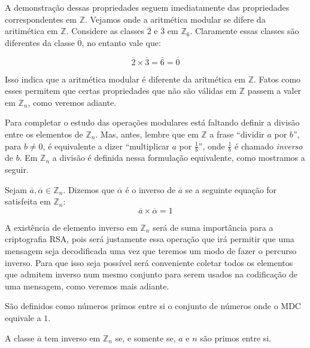 A demonstra\c{c}\~{a}o dessas propriedades seguem imediatamente das propriedades correspondentes em $\mathbb{Z}$.
Vejamos onde a aritm\'{e}tica modular se difere da aritim\'{e}tica em $\mathbb{Z}$. Considere as classes 
$\overline{2}$ e $\overline{3}$ em $\mathbb{Z}_{6}$. Claramente essas classes s\~{a}o diferentes
da classe $\overline{0}$, no entanto vale que:

$$\overline{2}\times\overline{3}=\overline{6}=\overline{0}$$
 
Isso indica que a aritm\'{e}tica modular \'{e} diferente da aritm\'{e}tica em $\mathbb{Z}$. Fatos como esses 
permitem que certas propriedades que n\~{a}o s\~{a}o v\'{a}lidas em $\mathbb{Z}$ passem a valer em $\mathbb{Z}_{n}$, como veremos 
adiante. 

Para completar o estudo das opera\c{c}\~{o}es modulares est\'{a} faltando definir a divis\~{a}o entre os elementos de $\mathbb{Z}_{n}$.
Mas, antes, lembre que em $\mathbb{Z}$ a frase ``dividir $a$ por $b$'', para $b\neq 0$, \'{e} equivalente a dizer
``multiplicar $a$ por $\frac{1}{b}$'', onde $\frac{1}{b}$ \'{e} chamado \textit{inverso} de $b$. 
Em $\mathbb{Z}_{n}$ a divis\~{a}o \'{e} definida nessa formula\c{c}\~{a}o equivalente, como mostramos a seguir. 

\begin{Df}
 Sejam $\overline{a},\overline{\alpha}\in\mathbb{Z}_{n}$. Dizemos que $\overline{\alpha}$ \'{e} o
inverso de $\overline{a}$ se a seguinte equa\c{c}\~{a}o for satisfeita em $\mathbb{Z}_{n}$:
							$$\overline{a}\times\overline{\alpha}=1$$  
\end{Df}


A exist\^{e}ncia de elemento inverso em $\mathbb{Z}_{n}$ ser\'{a} de suma import\^{a}ncia para a criptografia RSA,
pois ser\'{a} justamente essa opera\c{c}\~{a}o que ir\'{a} permitir que uma mensagem seja decodificada uma vez que teremos 
um modo de fazer o percurso inverso. Para que isso seja poss\'{i}vel ser\'{a} conveniente coletar todos os elementos que admitem 
inverso num mesmo conjunto para serem usados na codifica\c{c}\~{a}o de uma mensagem, como veremos mais adiante.
\begin{Df}
	S\~ao definidos como n\'umeros primos entre si o conjunto de n\'umeros onde o MDC equivale a $1$.
\end{Df}
\begin{Th}\label{inversao}
A classe $\overline{a}$ tem inverso em $\mathbb{Z}_n$ se, e somente se, $a$ e $n$ s\~ao primos entre si.
\end{Th}

